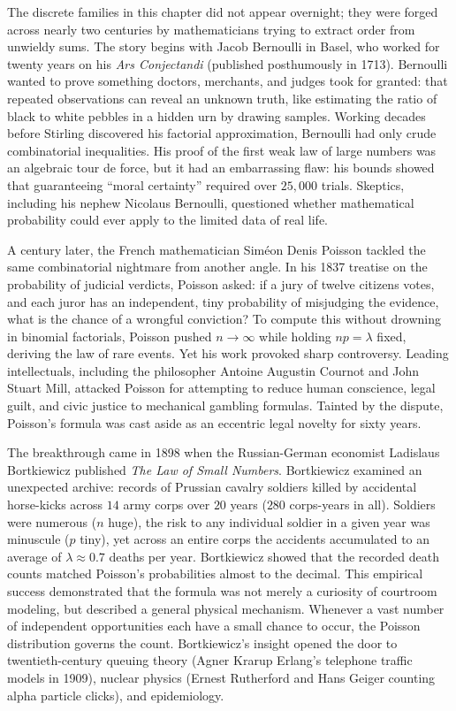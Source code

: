 \begin{historybox}
The discrete families in this chapter did not appear overnight; they were forged
across nearly two centuries by mathematicians trying to extract order from
unwieldy sums. The story begins with Jacob Bernoulli in Basel, who worked for
twenty years on his \emph{Ars Conjectandi} (published posthumously in 1713).
Bernoulli wanted to prove something doctors, merchants, and judges took for
granted: that repeated observations can reveal an unknown truth, like estimating
the ratio of black to white pebbles in a hidden urn by drawing samples. Working
decades before Stirling discovered his factorial approximation, Bernoulli had only
crude combinatorial inequalities. His proof of the first weak law of large
numbers was an algebraic tour de force, but it had an embarrassing flaw: his
bounds showed that guaranteeing ``moral certainty'' required over $25{,}000$
trials. Skeptics, including his nephew Nicolaus Bernoulli, questioned whether
mathematical probability could ever apply to the limited data of real
life.

A century later, the French mathematician Sim\'eon Denis Poisson tackled the same
combinatorial nightmare from another angle. In his 1837 treatise on the
probability of judicial verdicts, Poisson asked: if a jury of twelve citizens
votes, and each juror has an independent, tiny probability of misjudging the
evidence, what is the chance of a wrongful conviction? To compute this without
drowning in binomial factorials, Poisson pushed $n \to \infty$ while holding
$n p = \lambda$ fixed, deriving the law of rare events. Yet his work provoked
sharp controversy. Leading intellectuals, including the philosopher Antoine
Augustin Cournot and John Stuart Mill, attacked Poisson for attempting to reduce
human conscience, legal guilt, and civic justice to mechanical gambling formulas.
Tainted by the dispute, Poisson's formula was cast aside as an eccentric legal
novelty for sixty years.

The breakthrough came in 1898 when the Russian-German economist Ladislaus
Bortkiewicz published \emph{The Law of Small Numbers}. Bortkiewicz examined an
unexpected archive: records of Prussian cavalry soldiers killed by accidental
horse-kicks across $14$ army corps over $20$ years ($280$ corps-years in all).
Soldiers were numerous ($n$ huge), the risk to any individual soldier in a given
year was minuscule ($p$ tiny), yet across an entire corps the accidents
accumulated to an average of $\lambda \approx 0.7$ deaths per year. Bortkiewicz
showed that the recorded death counts matched Poisson's probabilities almost to
the decimal. This empirical success demonstrated that the formula was not merely
a curiosity of courtroom modeling, but described a general physical mechanism.
Whenever a vast number of independent opportunities each have a small chance to occur,
the Poisson distribution governs the count. Bortkiewicz's insight opened the door to
twentieth-century queuing theory (Agner Krarup Erlang's telephone traffic models
in 1909), nuclear physics (Ernest Rutherford and Hans Geiger counting alpha
particle clicks), and epidemiology.


\end{historybox}

